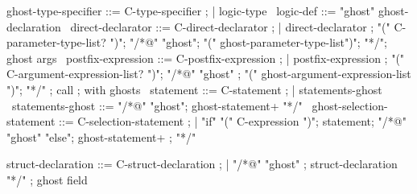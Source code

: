 \begin{syntax}

  ghost-type-specifier ::= C-type-specifier ;
  | {logic-type} \
  logic-def ::= "ghost" ghost-declaration \
  direct-declarator ::= C-direct-declarator ;
    | direct-declarator ;
    "(" C-parameter-type-list? ")";
        "/*@" "ghost";
          "(" ghost-parameter-type-list")";
          "*/"; ghost args
        \
  postfix-expression ::= C-postfix-expression ;
    | postfix-expression ;
     "(" C-argument-expression-list? ")";
     "/*@" "ghost" ;
       "(" ghost-argument-expression-list ")";
       "*/" ; call
              ; with ghosts
    \
  statement ::= C-statement ;
             | statements-ghost \
  statements-ghost ::= "/*@" "ghost";
                       ghost-statement+ "*/" \
  ghost-selection-statement ::= C-selection-statement ;
    | "if" "(" C-expression ")";
       statement;
      {"/*@" "ghost" "else"};
      {  ghost-statement+ };
      {  "*/"} \

  struct-declaration ::= C-struct-declaration ;
  | {"/*@" "ghost" };
    { struct-declaration "*/"} ; ghost field

\end{syntax}

